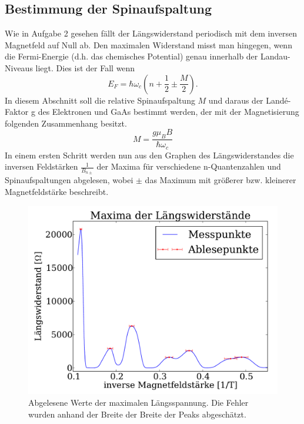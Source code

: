 \documentclass[paper=a4,fontsize=10pt,DIV=18,twocolumn,parskip=half]{scrartcl}
\numberwithin{equation}{section}    %
\begin{document}
\subsection{Bestimmung der Spinaufspaltung}
\label{a6}
Wie in Aufgabe 2 gesehen fällt der Längswiderstand periodisch mit dem inversen Magnetfeld auf Null ab. Den maximalen Widerstand misst man hingegen, wenn die Fermi-Energie (d.h. das chemisches Potential) genau innerhalb der Landau-Niveaus liegt. Dies ist der Fall wenn
\begin{equation}
E_F=\hbar \omega_c\left( n+\frac{1}{2}\pm\frac{M}{2}\right).
\end{equation}
In diesem Abschnitt soll die relative Spinaufspaltung $M$ und daraus der Landé-Faktor g des Elektronen und GaAs bestimmt werden, der mit der Magnetisierung folgenden Zusammenhang besitzt.
\begin{equation}
M=\frac{g \mu_B B}{\hbar \omega_c}
\label{lande}
\end{equation}
In einem ersten Schritt werden nun aus den Graphen des Längswiderstandes die inversen Feldstärken $\frac{1}{B_{n\pm}}$ der Maxima für verschiedene n-Quantenzahlen und Spinaufspaltungen abgelesen, wobei $\pm$ das Maximum mit größerer bzw. kleinerer Magnetfeldstärke beschreibt.

\begin{figure}[]
	\begin{center}
		\includegraphics[width=\columnwidth]{Data-Plots/07-maxima_ablesen.pdf}
		\caption{Abgelesene Werte der maximalen Längsspannung. Die Fehler wurden anhand der Breite der Breite der Peaks abgeschätzt.}
		\label{maxima}
	\end{center}
\end{figure}
\end{document}
